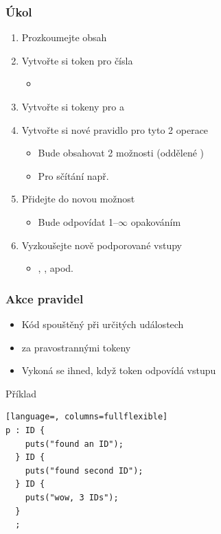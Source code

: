 \begin{frame}[fragile]
  \frametitle{Úkol}

  \begin{enumerate}
    \item Prozkoumejte obsah 
    \item Vytvořte si token  pro čísla
    \begin{itemize}
      \item {}
    \end{itemize}

    \item Vytvořte si tokeny pro \code{\+} a \code{\-}
    \item Vytvořte si nové pravidlo  pro tyto 2 operace
    \begin{itemize}
      \item Bude obsahovat 2 možnosti (oddělené \code{|})
      \item Pro sčítání např.\ 
    \end{itemize}

    \item Přidejte do  novou možnost
    \begin{itemize}
      \item Bude odpovídat 1--$\infty$ opakováním 
    \end{itemize}

    \item Vyzkoušejte nově podporované vstupy
    \begin{itemize}
      \item {}, , apod.
    \end{itemize}
  \end{enumerate}

\end{frame}


\begin{frame}[fragile]
  \frametitle{Akce pravidel}

  \begin{itemize}
    \item Kód spouštěný při určitých událostech
    \item {} za pravostrannými tokeny
    \item Vykoná se ihned, když token odpovídá vstupu
  \end{itemize}

  \begin{block}{Příklad}
  \begin{lstlisting}[language=, columns=fullflexible]
p : ID {
    puts("found an ID");
  } ID {
    puts("found second ID");
  } ID {
    puts("wow, 3 IDs");
  }
  ;
  \end{lstlisting}
  \end{block}

\end{frame}

